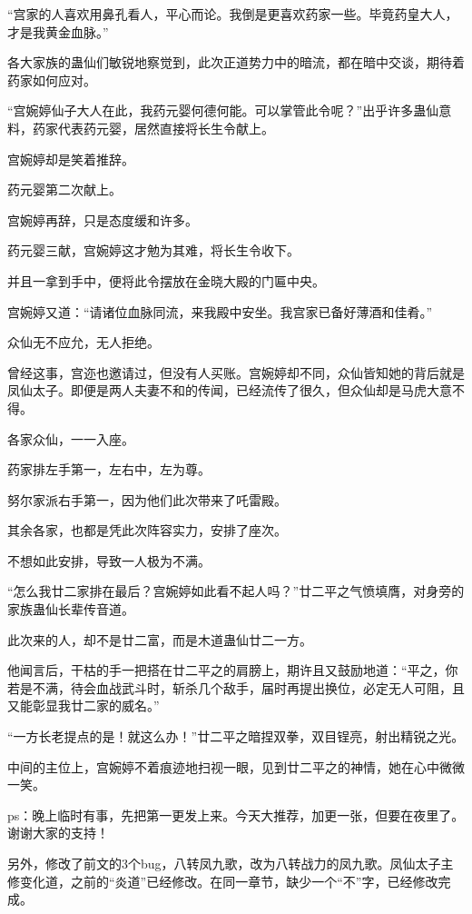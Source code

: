 \begin{this_body}
“宫家的人喜欢用鼻孔看人，平心而论。我倒是更喜欢药家一些。毕竟药皇大人，才是我黄金血脉。”

各大家族的蛊仙们敏锐地察觉到，此次正道势力中的暗流，都在暗中交谈，期待着药家如何应对。

“宫婉婷仙子大人在此，我药元婴何德何能。可以掌管此令呢？”出乎许多蛊仙意料，药家代表药元婴，居然直接将长生令献上。

宫婉婷却是笑着推辞。

药元婴第二次献上。

宫婉婷再辞，只是态度缓和许多。

药元婴三献，宫婉婷这才勉为其难，将长生令收下。

并且一拿到手中，便将此令摆放在金晓大殿的门匾中央。

宫婉婷又道：“请诸位血脉同流，来我殿中安坐。我宫家已备好薄酒和佳肴。”

众仙无不应允，无人拒绝。

曾经这事，宫迩也邀请过，但没有人买账。宫婉婷却不同，众仙皆知她的背后就是凤仙太子。即便是两人夫妻不和的传闻，已经流传了很久，但众仙却是马虎大意不得。

各家众仙，一一入座。

药家排左手第一，左右中，左为尊。

努尔家派右手第一，因为他们此次带来了吒雷殿。

其余各家，也都是凭此次阵容实力，安排了座次。

不想如此安排，导致一人极为不满。

“怎么我廿二家排在最后？宫婉婷如此看不起人吗？”廿二平之气愤填膺，对身旁的家族蛊仙长辈传音道。

此次来的人，却不是廿二富，而是木道蛊仙廿二一方。

他闻言后，干枯的手一把搭在廿二平之的肩膀上，期许且又鼓励地道：“平之，你若是不满，待会血战武斗时，斩杀几个敌手，届时再提出换位，必定无人可阻，且又能彰显我廿二家的威名。”

“一方长老提点的是！就这么办！”廿二平之暗捏双拳，双目锃亮，射出精锐之光。

中间的主位上，宫婉婷不着痕迹地扫视一眼，见到廿二平之的神情，她在心中微微一笑。

ps：晚上临时有事，先把第一更发上来。今天大推荐，加更一张，但要在夜里了。谢谢大家的支持！

另外，修改了前文的3个bug，八转凤九歌，改为八转战力的凤九歌。凤仙太子主修变化道，之前的“炎道”已经修改。在同一章节，缺少一个“不”字，已经修改完成。

\end{this_body}

